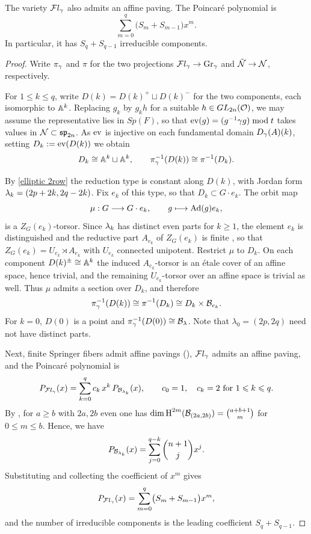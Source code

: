 \documentclass[11pt]{article}
\numberwithin{equation}{section}
\begin{document}
 
\begin{cor}
    The variety $\mathcal{F}l_\gamma$ also admits an affine paving. The Poincar\'e polynomial is
    \[
    \sum_{m=0}^{q}\bigl(S_m+S_{m-1}\bigr)x^{m}.
    \]
    In particular, it has $S_q+S_{q-1}$ irreducible components.
\end{cor}
\begin{proof}
Write $\pi_\gamma$ and $\pi$ for the two projections $\mathcal{F}l_\gamma\to \operatorname{Gr}_\gamma$ and $\tilde{\mathcal{N}}\to \mathcal{N}$, respectively.

For $1\leqslant k\leqslant q$, write $D(k)=D(k)^+\sqcup D(k)^-$ for the two components, each isomorphic to
$\mathbb{A}^k$. Replacing $g_k$ by $g_kh$ for a suitable $h\in GL_{2n}(\mathcal{O})$, we may
assume the representative lies in $Sp(F)$, so that $\operatorname{ev}(g)=(g^{-1}\gamma g)\bmod t$
takes values in $\mathcal{N}\subset\mathfrak{sp}_{2n}$. As $\operatorname{ev}$ is injective on each fundamental
domain $D_\gamma(A)(k)$, setting $D_k:=\operatorname{ev}(D(k))$ we obtain
\[
D_k\cong\mathbb{A}^{k}\sqcup\mathbb{A}^{k},
\qquad
\pi_\gamma^{-1}(D(k))\cong\pi^{-1}(D_k).
\]

By \cref{elliptic 2row} the reduction type is constant along $D(k)$, with Jordan
form $\lambda_k=(2p+2k,2q-2k)$. Fix $e_k$ of this type, so that $D_k\subset G\cdot
e_k$. The orbit map
\[
\mu:G\longrightarrow G\cdot e_k,
\qquad
g\longmapsto \operatorname{Ad}(g)e_k,
\]
is a $Z_G(e_k)$-torsor. Since $\lambda_k$ has distinct even parts for $k\geqslant 1$, the element $e_k$ is
distinguished and the reductive part $A_{e_k}$ of $Z_G(e_k)$ is finite
\cite[Section~5]{collingwood1993nilpotent}, so that
$Z_G(e_k)=U_{e_k}\rtimes A_{e_k}$ with $U_{e_k}$ connected unipotent. Restrict
$\mu$ to $D_k$. On each component $D(k)^{\pm}\cong\mathbb{A}^{k}$ the induced
$A_{e_k}$-torsor is an \'etale cover of an affine space, hence trivial, and the
remaining $U_{e_k}$-torsor over an affine space is trivial as well. Thus $\mu$
admits a section over $D_k$, and therefore
\[
\pi_\gamma^{-1}(D(k))\cong\pi^{-1}(D_k)\cong D_k\times\mathcal{B}_{e_k}.
\]
For $k=0$, $D(0)$ is a point and $\pi_\gamma^{-1}(D(0))\cong\mathcal{B}_\lambda$. Note that $\lambda_0=(2p,2q)$ need not have distinct parts.

Next, finite Springer fibers admit affine pavings (\cite{DLP}), $\mathcal{F}l_\gamma$ admits an
affine paving, and the Poincar\'e polynomial is
\[
P_{\mathcal{F}l_\gamma}(x)=\sum_{k=0}^{q}c_k\,x^{k}\,P_{\mathcal{B}_{\lambda_k}}(x),
\qquad c_0=1,\quad c_{k}=2 \text{ for } 1\leqslant k\leqslant q.
\]
By \cite[Prop.~8.3]{Kim}, for $a\geqslant b$ with $2a,2b$ even one has
$\dim \operatorname{H}^{2m}(\mathcal{B}_{(2a,2b)})=\binom{a+b+1}{m}$ for $0\leqslant m\leqslant b$. Hence, we have $$P_{\mathcal{B}_{\lambda_k}}(x)
=\sum_{j=0}^{q-k}\binom{n+1}{j}x^{j}.$$ Substituting and collecting
the coefficient of $x^m$ gives
\[
P_{\mathcal{F}l_\gamma}(x)=\sum_{m=0}^{q}\bigl(S_m+S_{m-1}\bigr)x^{m},
\]
and the number of irreducible components is the leading coefficient
$S_q+S_{q-1}$.
\end{proof}
\end{document}
